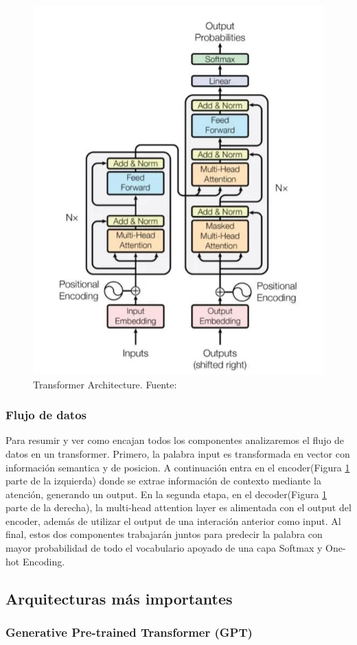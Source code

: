 \newpage
    \begin{figure}[H]
            \centering
            \includegraphics[width=.6\textwidth]{plantilla-libro/img/transformer_architecture.png}
            \caption{Transformer Architecture. Fuente: \cite{vaswani2023attention}}
            \label{fig:transformer}
        \end{figure}
    \subsubsection{Flujo de datos}
    Para resumir y ver como encajan todos los componentes analizaremos el flujo de datos en un transformer. 
    Primero, la palabra input es transformada en vector con información semantica y de posicion. A continuación entra en el encoder(Figura \ref{fig:transformer} parte de la izquierda) donde se extrae información de contexto mediante la atención, generando un output.
    En la segunda etapa, en el decoder(Figura \ref{fig:transformer} parte de la derecha), la multi-head attention layer es alimentada con el output del encoder, además de utilizar el output de una interación anterior como input. 
    Al final, estos dos componentes trabajarán juntos para predecir la palabra con mayor probabilidad de todo el vocabulario apoyado de una capa Softmax y One-hot Encoding.\cite{atention-blog}
\subsection{Arquitecturas más importantes}
\subsubsection{Generative Pre-trained Transformer (GPT)}
     
